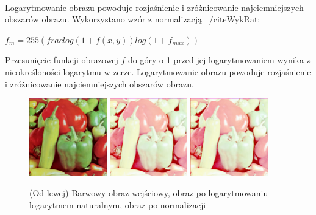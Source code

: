 \documentclass[final,a4paper,openany,12pt]{mwbk}
\begin{document}
\hfill\\
\indent
Logarytmowanie obrazu powoduje rozjaśnienie i zróżnicowanie najciemniejszych obszarów obrazu.
Wykorzystano wzór z normalizacją ~/cite{WykRat}:
	
	\begin{center}
		$f_{m} = 255(frac{log(1 + f(x,y))}{log(1 + f_{max})})$
	\end{center}

	
Przesunięcie funkcji obrazowej $f$ do góry o 1 przed jej logarytmowaniem wynika z nieokreśloności logarytmu w zerze. Logarytmowanie obrazu powoduje rozjaśnienie i zróżnicowanie najciemniejszych obszarów obrazu.	

\begin{figure}[H]
	\begin{center}
		\includegraphics[width=0.3\textwidth]{1/1Color_Log_Original}
		\includegraphics[width=0.3\textwidth]{1/1Color_Log_Result}
		\includegraphics[width=0.3\textwidth]{1/1Color_Log_Result_Norm}
	\end{center}
	\caption{(Od lewej) Barwowy obraz wejściowy, obraz po logarytmowaniu logarytmem naturalnym, obraz po normalizacji }
\end{figure}
\end{document}
